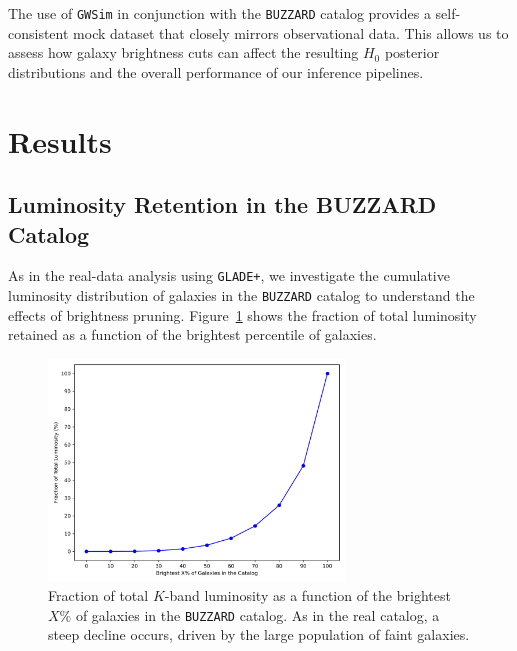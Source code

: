 The use of \texttt{\texttt{GWSim}} in conjunction with the \texttt{BUZZARD} catalog provides a self-consistent mock dataset that closely mirrors observational data. This allows us to assess how galaxy brightness cuts can affect the resulting $H_0$ posterior distributions and the overall performance of our inference pipelines.

\newpage

\section{Results}

\subsection{Luminosity Retention in the BUZZARD Catalog}

As in the real-data analysis using \texttt{GLADE+}, we investigate the cumulative luminosity distribution of galaxies in the \texttt{BUZZARD} catalog to understand the effects of brightness pruning. Figure~\ref{fig:luminosity_buzzard} shows the fraction of total luminosity retained as a function of the brightest percentile of galaxies.

\begin{figure}[h]
    \centering
    \includegraphics[width=0.7\textwidth]{figures/luminosity_fraction_vs_percentile_BUZZARD.png}
    \caption[\texttt{BUZZARD} luminosity retention.]{Fraction of total $K$-band luminosity as a function of the brightest $X\%$ of galaxies in the \texttt{BUZZARD} catalog. As in the real catalog, a steep decline occurs, driven by the large population of faint galaxies.\footnotemark}
    \label{fig:luminosity_buzzard}
\end{figure}

